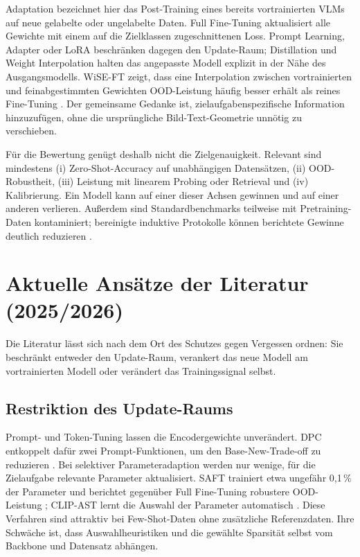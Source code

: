 \documentclass[conference]{IEEEtran}
\begin{document}
Adaptation bezeichnet hier das Post-Training eines bereits vortrainierten
VLMs auf neue gelabelte oder ungelabelte Daten. Full Fine-Tuning aktualisiert
alle Gewichte mit einem auf die Zielklassen zugeschnittenen Loss. Prompt
Learning, Adapter oder LoRA beschränken dagegen den Update-Raum; Distillation
und Weight Interpolation halten das angepasste Modell explizit in der Nähe
des Ausgangsmodells. WiSE-FT zeigt, dass eine Interpolation zwischen
vortrainierten und feinabgestimmten Gewichten OOD-Leistung häufig besser
erhält als reines Fine-Tuning \cite{wisefit}. Der gemeinsame Gedanke ist,
zielaufgabenspezifische Information hinzuzufügen, ohne die ursprüngliche
Bild-Text-Geometrie unnötig zu verschieben.

Für die Bewertung genügt deshalb nicht die Zielgenauigkeit. Relevant sind
mindestens (i) Zero-Shot-Accuracy auf unabhängigen Datensätzen, (ii)
OOD-Robustheit, (iii) Leistung mit linearem Probing oder Retrieval und
(iv) Kalibrierung. Ein Modell kann auf einer dieser Achsen gewinnen und auf
einer anderen verlieren. Außerdem sind Standardbenchmarks teilweise mit
Pretraining-Daten kontaminiert; bereinigte induktive Protokolle können
berichtete Gewinne deutlich reduzieren \cite{kravets}.

\section{Aktuelle Ansätze der Literatur (2025/2026)}
Die Literatur lässt sich nach dem Ort des Schutzes gegen Vergessen ordnen:
Sie beschränkt entweder den Update-Raum, verankert das neue Modell am
vortrainierten Modell oder verändert das Trainingssignal selbst.

\subsection{Restriktion des Update-Raums}
Prompt- und Token-Tuning lassen die Encodergewichte unverändert. DPC
entkoppelt dafür zwei Prompt-Funktionen, um den Base-New-Trade-off zu
reduzieren \cite{dpc}. Bei selektiver Parameteradaption werden nur wenige,
für die Zielaufgabe relevante Parameter aktualisiert. SAFT trainiert etwa
ungefähr 0,1\,\% der Parameter und berichtet gegenüber Full Fine-Tuning
robustere OOD-Leistung \cite{saft}; CLIP-AST lernt die Auswahl der Parameter
automatisch \cite{clipast}. Diese Verfahren sind attraktiv bei Few-Shot-Daten
ohne zusätzliche Referenzdaten. Ihre Schwäche ist, dass Auswahlheuristiken
und die gewählte Sparsität selbst vom Backbone und Datensatz abhängen.
\end{document}

